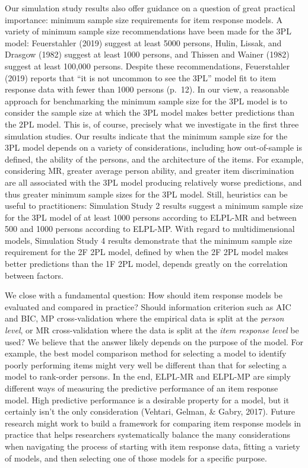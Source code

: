 \documentclass[
  english,
  man,floatsintext]{apa7}
\begin{document}
Our simulation study results also offer guidance on a question of great practical importance: minimum sample size requirements for item response models. A variety of minimum sample size recommendations have been made for the 3PL model: Feuerstahler (2019) suggest at least 5000 persons, Hulin, Lissak, and Drasgow (1982) suggest at least 1000 persons, and Thissen and Wainer (1982) suggest at least 100,000 persons. Despite these recommendations, Feuerstahler (2019) reports that ``it is not uncommon to see the 3PL'' model fit to item response data with fewer than 1000 persons (p.~12). In our view, a reasonable approach for benchmarking the minimum sample size for the 3PL model is to consider the sample size at which the 3PL model makes better predictions than the 2PL model. This is, of course, precisely what we investigate in the first three simulation studies. Our results indicate that the minimum sample size for the 3PL model depends on a variety of considerations, including how out-of-sample is defined, the ability of the persons, and the architecture of the items. For example, considering MR, greater average person ability, and greater item discrimination are all associated with the 3PL model producing relatively worse predictions, and thus greater minimum sample sizes for the 3PL model. Still, heuristics can be useful to practitioners: Simulation Study 2 results suggest a minimum sample size for the 3PL model of at least 1000 persons according to ELPL-MR and between 500 and 1000 persons according to ELPL-MP. With regard to multidimensional models, Simulation Study 4 results demonstrate that the minimum sample size requirement for the 2F 2PL model, defined by when the 2F 2PL model makes better predictions than the 1F 2PL model, depends greatly on the correlation between factors.

We close with a fundamental question: How should item response models be evaluated and compared in practice? Should information criterion such as AIC and BIC, MP cross-validation where the empirical data is split at the \emph{person level}, or MR cross-validation where the data is split at the \emph{item response level} be used? We believe that the answer likely depends on the purpose of the model. For example, the best model comparison method for selecting a model to identify poorly performing items might very well be different than that for selecting a model to rank-order persons. In the end, ELPL-MR and ELPL-MP are simply different ways of measuring the predictive performance of an item response model. High predictive performance is a desirable property for a model, but it certainly isn't the only consideration (Vehtari, Gelman, \& Gabry, 2017). Future research might work to build a framework for comparing item response models in practice that helps researchers systematically balance the many considerations when navigating the process of starting with item response data, fitting a variety of models, and then selecting one of those models for a specific purpose.
\end{document}
